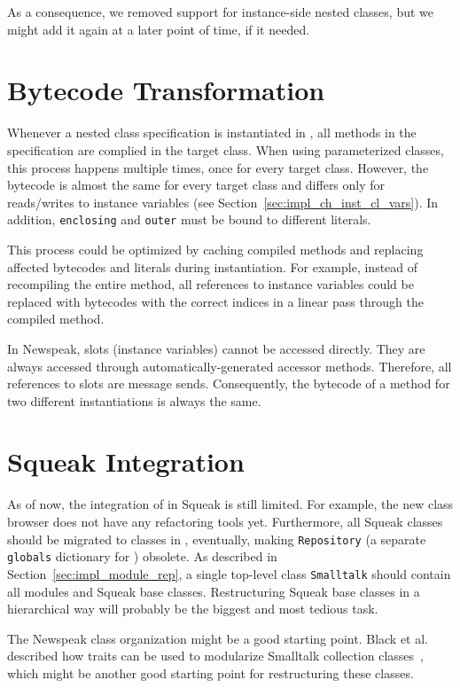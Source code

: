 As a consequence, we removed support for instance-side nested classes, but we might add it again at a later point of time, if it needed.

\section{Bytecode Transformation}
Whenever a nested class specification is instantiated in \msname, all methods in the specification are complied in the target class. When using parameterized classes, this process happens multiple times, once for every target class. However, the bytecode is almost the same for every target class and differs only for reads/writes to instance variables (see Section~\ref{sec:impl_ch_inst_cl_vars}). In addition, \texttt{enclosing} and \texttt{outer} must be bound to different literals.

This process could be optimized by caching compiled methods and replacing affected bytecodes and literals during instantiation. For example, instead of recompiling the entire method, all references to instance variables could be replaced with bytecodes with the correct indices in a linear pass through the compiled method.

In Newspeak, slots (instance variables) cannot be accessed directly. They are always accessed through automatically-generated accessor methods. Therefore, all references to slots are message sends. Consequently, the bytecode of a method for two different instantiations is always the same.

\section{Squeak Integration}
As of now, the integration of \msname in Squeak is still limited. For example, the new class browser does not have any refactoring tools yet. Furthermore, all Squeak classes should be migrated to classes in \msname, eventually, making \texttt{Repository} (a separate \texttt{globals} dictionary for \msname) obsolete. As described in Section~\ref{sec:impl_module_rep}, a single top-level class \texttt{Smalltalk} should contain all modules and Squeak base classes. Restructuring Squeak base classes in a hierarchical way will probably be the biggest and most tedious task. 

The Newspeak class organization might be a good starting point. Black et al. described how traits can be used to modularize Smalltalk collection classes~\cite{Black:2003:ATS:949305.949311}, which might be another good starting point for restructuring these classes.

